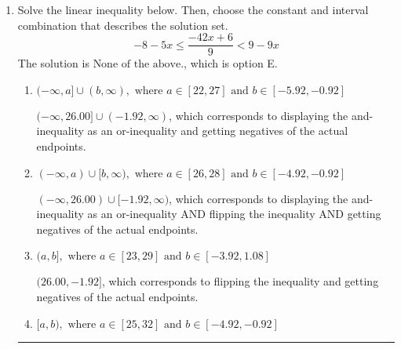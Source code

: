 \documentclass{extbook}[14pt]
\newcommand{\litem}[1]{\item #1

\rule{\textwidth}{0.4pt}}
\begin{document}
\begin{enumerate}
{\begin{enumerate}[label=\Alph*.]
$[7.75, -12.25)$, which corresponds to flipping the inequality and getting negatives of the actual endpoints.
\item \( (-\infty, a] \cup (b, \infty), \text{ where } a \in [7.75, 8.75] \text{ and } b \in [-13.25, -9.25] \)

$(-\infty, 7.75] \cup (-12.25, \infty)$, which corresponds to displaying the and-inequality as an or-inequality AND flipping the inequality AND getting negatives of the actual endpoints.
\item \( (-\infty, a) \cup [b, \infty), \text{ where } a \in [7.75, 10.75] \text{ and } b \in [-14.25, -11.25] \)

$(-\infty, 7.75) \cup [-12.25, \infty)$, which corresponds to displaying the and-inequality as an or-inequality and getting negatives of the actual endpoints.
\item \( \text{None of the above.} \)

* This is correct as the answer should be $(-7.75, 12.25]$.
\end{enumerate}

\textbf{General Comment:} To solve, you will need to break up the compound inequality into two inequalities. Be sure to keep track of the inequality! It may be best to draw a number line and graph your solution.
}
\litem{
Solve the linear inequality below. Then, choose the constant and interval combination that describes the solution set.
\[ -8 - 5 x \leq \frac{-42 x + 6}{9} < 9 - 9 x \]The solution is \( \text{None of the above.} \), which is option E.\begin{enumerate}[label=\Alph*.]
\item \( (-\infty, a] \cup (b, \infty), \text{ where } a \in [22, 27] \text{ and } b \in [-5.92, -0.92] \)

$(-\infty, 26.00] \cup (-1.92, \infty)$, which corresponds to displaying the and-inequality as an or-inequality and getting negatives of the actual endpoints.
\item \( (-\infty, a) \cup [b, \infty), \text{ where } a \in [26, 28] \text{ and } b \in [-4.92, -0.92] \)

$(-\infty, 26.00) \cup [-1.92, \infty)$, which corresponds to displaying the and-inequality as an or-inequality AND flipping the inequality AND getting negatives of the actual endpoints.
\item \( (a, b], \text{ where } a \in [23, 29] \text{ and } b \in [-3.92, 1.08] \)

$(26.00, -1.92]$, which corresponds to flipping the inequality and getting negatives of the actual endpoints.
\item \( [a, b), \text{ where } a \in [25, 32] \text{ and } b \in [-4.92, -0.92] \)


\end{enumerate}}
\end{enumerate}
\end{document}

